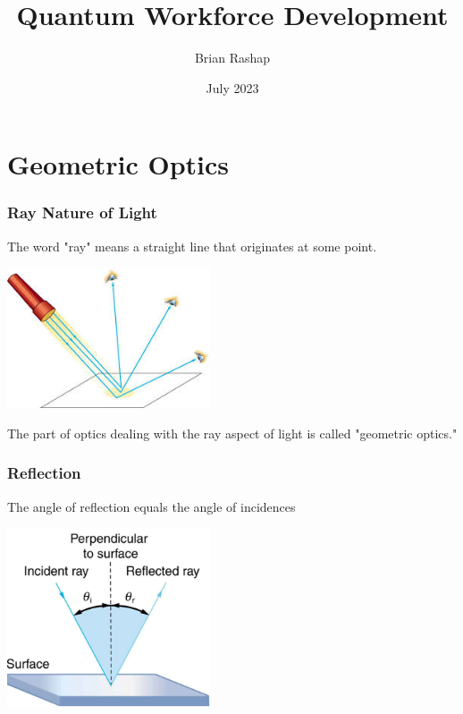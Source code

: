 \documentclass{beamer}
\begin{document}
\title{Quantum Workforce Development}
\author{Brian Rashap}
\date{July 2023} 

\begin{frame}
\titlepage
\end{frame}


\section{Geometric Optics}

\begin{frame}\frametitle{Ray Nature of Light}
The word "ray" means a straight line that originates at some point.

\begin{center}
\includegraphics[width=6cm]{fig/rays.jpg}
\end{center}

The part of optics dealing with the ray aspect of light is called "geometric optics."

\end{frame}


\begin{frame}\frametitle{Reflection}
The angle of reflection equals the angle of incidences

\begin{center}
\includegraphics[width=6cm]{fig/reflect.png}
\end{center}

\end{frame}
\end{document}
